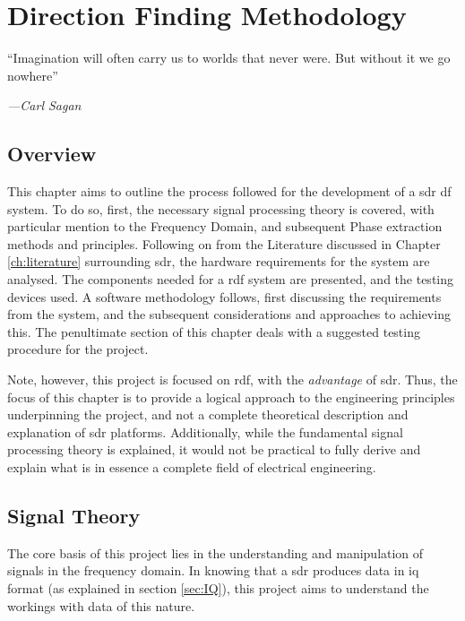 \documentclass[class=report,11pt,crop=false]{standalone}
\begin{document}
\ifstandalone
\tableofcontents
\fi
\chapter{Direction Finding Methodology \label{ch:meth}}
\epigraph{``Imagination will often carry us to worlds that never were. But without it we go nowhere''
}%
    {\emph{---Carl Sagan}}
\vspace{0.5cm}

\section{Overview}
This chapter aims to outline the process followed for the development of a \gls{sdr} \gls{df} system. To do so, first, the necessary signal processing theory is covered, with particular mention to the Frequency Domain, and subsequent Phase extraction methods and principles. Following on from the Literature discussed in Chapter \ref{ch:literature} surrounding \gls{sdr}, the hardware requirements for the system are analysed. The components needed for a \gls{rdf} system are presented, and the testing devices used. A software methodology follows, first discussing the requirements from the system, and the subsequent considerations and approaches to achieving this.
The penultimate section of this chapter deals with a suggested testing procedure for the project.

Note, however, this project is focused on \gls{rdf}, with the \emph{advantage} of \gls{sdr}. Thus, the focus of this chapter is to provide a logical approach to the engineering principles underpinning the project, and not a complete theoretical description and explanation of \gls{sdr} platforms. Additionally, while the fundamental signal processing theory is explained, it would not be practical to fully derive and explain what is in essence a complete field of electrical engineering. 


\section{Signal Theory \label{sec:Signal-Theory}}
The core basis of this project lies in the understanding and manipulation of signals in the frequency domain. In knowing that a \gls{sdr} produces data in \gls{iq} format (as explained in section \ref{sec:IQ}), this project aims to understand the workings with data of this nature.
\end{document}
